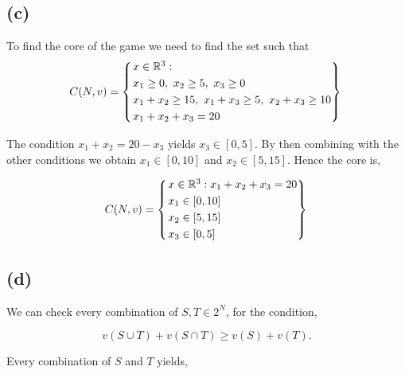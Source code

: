 \documentclass[american]{scrartcl}
\newcommand{\Real}{\mathbb{R}}
\begin{document}
\subsection*{(c)}

To find the core of the game we need to find the set such that
\begin{equation}
    C(N, v) =
    \begin{dcases}
        \begin{rcases}
            x \in \Real^3: \\
            x_1 \geq 0, \ x_2 \geq 5, \ x_3 \geq 0\\
            x_1 + x_2 \geq 15, \ x_1 + x_3 \geq 5, \ x_2 + x_3 \geq 10 \\
            x_1 + x_2 + x_3 = 20
        \end{rcases}
    \end{dcases}\\
\end{equation}

The condition $x_1 + x_2 = 20 - x_3$ yields $x_3 \in [0, 5]$. By then combining with the other conditions we obtain $x_1 \in [0, 10]$ and $x_2 \in [5, 15]$. Hence the core is,

\begin{equation}
    C(N, v) =
    \begin{dcases}
        \begin{rcases}
            x \in \Real^3: x_1 + x_2 + x_3 = 20 \\
            x_1 \in [0, 10] \\
            x_2 \in [5, 15] \\
            x_3 \in [0, 5]
        \end{rcases}
    \end{dcases}
\end{equation}

\subsection*{(d)}
We can check every combination of $S, T \in 2^N$, for the condition,

\begin{equation}
    v\left(S \cup T\right) + v\left(S \cap T\right) \geq v(S) + v(T).
\end{equation}

Every combination of $S$ and $T$ yields,
\end{document}
